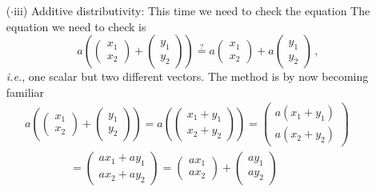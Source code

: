 {\begin{enumerate}
\begin{gather*}
=
a\begin{pmatrix}x_1\\x_2\end{pmatrix}+
b\begin{pmatrix} x_1\\x_2\end{pmatrix}\, ,
\end{gather*}
as required.
\item[($\cdot$iii)] Additive distributivity:
This time we need to check the equation
The equation we need to check is
\[
a\left(
\begin{pmatrix}x_1\\x_2\end{pmatrix}
+
\begin{pmatrix}y_1\\y_2\end{pmatrix}\right)\stackrel?=
a\begin{pmatrix}x_1\\x_2\end{pmatrix}+
a\begin{pmatrix}y_1\\y_2\end{pmatrix}
\, ,
\] 
{\itshape i.e.}, one scalar but two different vectors.
The method is by now becoming familiar
\begin{gather*}
a\left(
\begin{pmatrix}x_1\\x_2\end{pmatrix}
+
\begin{pmatrix}y_1\\y_2\end{pmatrix}\right)=
a\left(
\begin{pmatrix}x_1+y_1\\x_2+y_2\end{pmatrix}
\right)
=
\begin{pmatrix}a(x_1+y_1)\\a(x_2+y_2)\end{pmatrix}
\qquad\\\qquad\qquad=
\begin{pmatrix}ax_1+ay_1\\ax_2+ay_2\end{pmatrix}
=
\begin{pmatrix}ax_1\\ax_2\end{pmatrix}+
\begin{pmatrix}ay_1\\ay_2\end{pmatrix}

\end{gather*}
\end{enumerate}}
